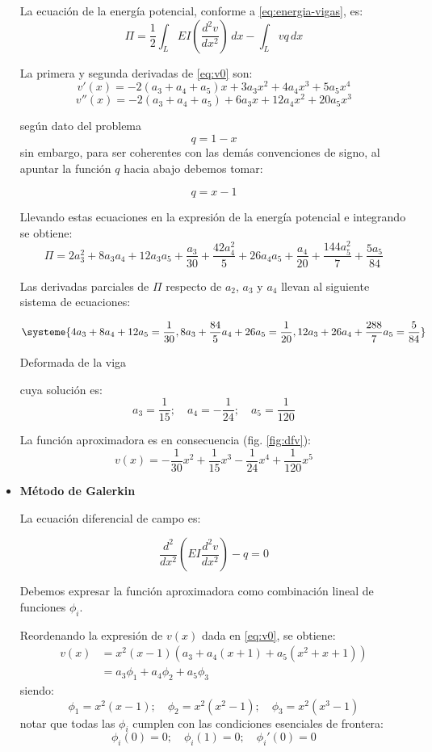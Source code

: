 \begin{example}
\begin{itemize}
	La ecuación de la energía potencial, conforme a \eqref{eq:energia-vigas}, es:
	\[ \Pi = \frac{1}{2} \int_L EI \left( \frac{d^2v}{dx^2} \right) \, dx - \int_L v q \, dx \]
	
	La primera y segunda derivadas de \eqref{eq:v0} son:
	\[ v'(x) = -2 \left(a_{3} + a_{4} + a_{5}\right) x + 3 a_{3} x^{2} + 4 a_{4} x^{3} + 5 a_{5} x^{4} \]
	\[ v''(x) = -2 \left(a_{3} + a_{4} + a_{5}\right) + 6 a_{3} x + 12 a_{4} x^{2} + 20 a_{5} x^{3} \]
	
	según dato del problema \[ q = 1 - x \]
	sin embargo, para ser coherentes con las demás convenciones de signo, al apuntar la
	función $q$ hacia abajo debemos tomar:

	\[q = x - 1\]
	
	Llevando estas ecuaciones en la expresión de la energía potencial e integrando se obtiene:
	\[ \Pi = 2 a_{3}^{2} + 8 a_{3} a_{4} + 12 a_{3} a_{5} + \frac{a_{3}}{30} + \frac{42 a_{4}^{2}}{5} + 26 a_{4} a_{5} + \frac{a_{4}}{20} + \frac{144 a_{5}^{2}}{7} + \frac{5 a_{5}}{84}\]
	
	Las derivadas parciales de $\Pi$ respecto de $a_2$, $a_3$ y $a_4$ llevan al siguiente sistema de ecuaciones:
	
	\[\systeme{4 a_{3} + 8 a_{4} + 12 a_{5} = \frac{1}{30}, 
	8 a_{3} + \frac{84}{5} a_{4} + 26 a_{5} = \frac{1}{20},
	12 a_{3} + 26 a_{4} + \frac{288}{7}a_{5} = \frac{5}{84}}
	\]
	\begin{marginfigure}[-.5cm]
		\centering
		
		\caption{Deformada de la viga}
		\label{fig:dfv}
	\end{marginfigure}
	cuya solución es:
	\[ a_3 = \frac{1}{15}; \quad a_4 = -\frac{1}{24}; \quad a_5 = \frac{1}{120} \]
	
	La función aproximadora es en consecuencia (fig. \ref{fig:dfv}):
	\[ v(x) = -\frac{1}{30}x^2 + \frac{1}{15}x^3 - \frac{1}{24}x^4 + \frac{1}{120}x^5 \]
	
	\item \textbf{Método de Galerkin}
	
	La ecuación diferencial de campo es:

	\[ \frac{d^2}{dx^2} \left( EI \frac{d^2v}{dx^2} \right) - q = 0 \]


	Debemos expresar la función aproximadora como combinación lineal de funciones $\phi_i$.
	
	Reordenando la expresión de $v(x)$ dada en \eqref{eq:v0}, se obtiene:
	\[ \begin{split}
		v(x) &= x^{2} \left(x - 1\right) \left(a_{3} + a_{4} \left(x + 1\right) + a_{5} \left(x^{2} + x + 1\right)\right) \\
		&= a_3\phi_1 + a_4\phi_2 + a_5 \phi_3
	\end{split} \]
	siendo:
	\[ \phi_1 = x^2(x-1); \quad \phi_2 = x^2 (x^2 -1); \quad \phi_3 = x^2(x^3-1) \]
	notar que todas las $\phi_i$ cumplen con las condiciones esenciales de frontera:
	\[ \phi_i(0) = 0; \quad \phi_i(1) = 0; \quad \phi_i'(0) = 0 \]
	

\end{itemize}
\end{example}
